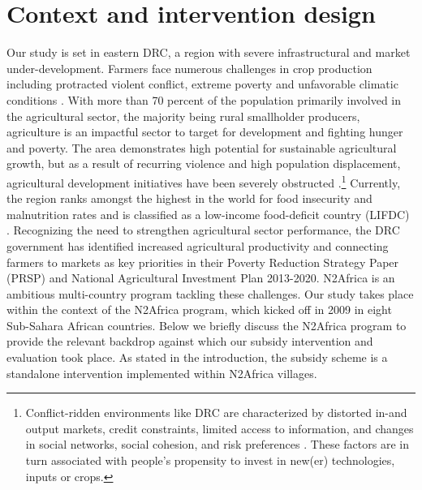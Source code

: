 \section{Context and intervention design}
Our study is set in eastern DRC, a region with severe infrastructural and market under-development. Farmers face numerous challenges in crop production including protracted violent conflict, extreme poverty and unfavorable climatic conditions \citep{Vlassenroot2005a,Ansoms2009}. With more than 70 percent of the population primarily involved in the agricultural sector, the majority being rural smallholder producers, agriculture is an impactful sector to target for development and fighting hunger and poverty. The area demonstrates high potential for sustainable agricultural growth, but as a result of recurring violence and high population displacement, agricultural development initiatives have been severely obstructed \citep{Vlassenroot2005a}.\footnote{Conflict-ridden environments like DRC are characterized by distorted in-and output markets, credit constraints, limited access to information, and changes in social networks, social cohesion, and risk preferences \citep[e.g.][]{Gonzalez2007,Voors2012a,Gilligan2014}. These factors are in turn associated with people’s propensity to invest in new(er) technologies, inputs or crops.} Currently, the region ranks amongst the highest in the world for food insecurity and malnutrition rates and is classified as a low-income food-deficit country (LIFDC) \citep{Lambrecht2016,Vanlauwe2019,WFP2014,Development2015}. Recognizing the need to strengthen agricultural sector performance, the DRC government has identified increased agricultural productivity and connecting farmers to markets as key priorities in their Poverty Reduction Strategy Paper (PRSP) and National Agricultural Investment Plan 2013-2020. 
N2Africa is an ambitious multi-country program tackling these challenges. Our study takes place within the context of the N2Africa program, which kicked off in 2009 in eight Sub-Sahara African countries. Below we briefly discuss the N2Africa program to provide the relevant backdrop against which our subsidy intervention and evaluation took place. As stated in the introduction, the subsidy scheme is a standalone intervention implemented within N2Africa villages. 

